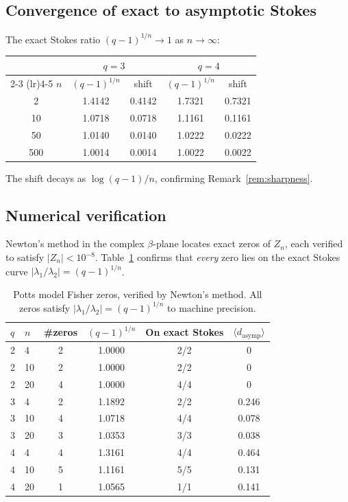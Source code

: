 \documentclass[12pt]{article}
\theoremstyle{definition}
\theoremstyle{remark}
\newcommand{\avg}[1]{\langle #1 \rangle}
\begin{document}
\subsection{Convergence of exact to asymptotic Stokes}

The exact Stokes ratio $(q{-}1)^{1/n} \to 1$ as $n \to \infty$:

\begin{center}
\begin{tabular}{ccccc}
\toprule
& \multicolumn{2}{c}{$q = 3$} & \multicolumn{2}{c}{$q = 4$} \\
\cmidrule(lr){2-3} \cmidrule(lr){4-5}
$n$ & $(q{-}1)^{1/n}$ & shift & $(q{-}1)^{1/n}$ & shift \\
\midrule
2 & 1.4142 & 0.4142 & 1.7321 & 0.7321 \\
10 & 1.0718 & 0.0718 & 1.1161 & 0.1161 \\
50 & 1.0140 & 0.0140 & 1.0222 & 0.0222 \\
500 & 1.0014 & 0.0014 & 1.0022 & 0.0022 \\
\bottomrule
\end{tabular}
\end{center}

\noindent The shift decays as $\log(q{-}1)/n$, confirming
Remark~\ref{rem:sharpness}.

\subsection{Numerical verification}

Newton's method in the complex $\beta$-plane locates exact zeros of
$Z_n$, each verified to satisfy $|Z_n| < 10^{-8}$.  Table~\ref{tab:potts_zeros}
confirms that \emph{every} zero lies on the exact Stokes curve
$|\lambda_1/\lambda_2| = (q{-}1)^{1/n}$.

\begin{table}[h]
\centering
\caption{Potts model Fisher zeros, verified by Newton's method.
  All zeros satisfy $|\lambda_1/\lambda_2| = (q{-}1)^{1/n}$ to
  machine precision.}
\label{tab:potts_zeros}
\begin{tabular}{llcccc}
\toprule
$q$ & $n$ & \#zeros & $(q{-}1)^{1/n}$ & On exact Stokes &
  $\avg{d_{\text{asymp}}}$ \\
\midrule
2 & 4  & 2 & 1.0000 & 2/2 & 0 \\
2 & 10 & 2 & 1.0000 & 2/2 & 0 \\
2 & 20 & 4 & 1.0000 & 4/4 & 0 \\
\midrule
3 & 4  & 2 & 1.1892 & 2/2 & 0.246 \\
3 & 10 & 4 & 1.0718 & 4/4 & 0.078 \\
3 & 20 & 3 & 1.0353 & 3/3 & 0.038 \\
\midrule
4 & 4  & 4 & 1.3161 & 4/4 & 0.464 \\
4 & 10 & 5 & 1.1161 & 5/5 & 0.131 \\
4 & 20 & 1 & 1.0565 & 1/1 & 0.141 \\
\bottomrule
\end{tabular}
\end{table}
\end{document}
